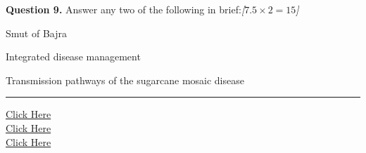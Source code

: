 \documentclass[11pt,a4paper]{article}
\newcommand{\pts}[1]{\hfill   \textit{[#1]}}
\begin{document}
\medskip


\noindent   \textbf{Question 9.} Answer any two of the following in brief:\pts{$7.5  \times 2 = 15$}

\begin{parts}
  \item Smut of Bajra
  \item Integrated disease management
  \item Transmission pathways of the sugarcane mosaic disease
\end{parts}

\vfill
\rule{\linewidth}{0.4pt}

\begin{center}\small
\href{https://bhu-exam.vercel.app/}{Click Here}\\[4pt]\href{https://me-aryan.vercel.app/}{Click Here}\\[4pt]\href{https://quashan-me.vercel.app/}{Click Here}
\end{center}
\end{document}

